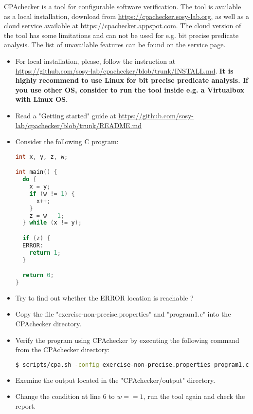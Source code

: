 \documentclass[language=en,sheet=5,prefix]{exercise}
\begin{document}
CPAchecker is a tool for configurable software verification. 
The tool is available as a local installation, download from \url{https://cpachecker.sosy-lab.org}, 
as well as a cloud service available at
\url{https://cpachecker.appspot.com}. The cloud version of the tool has some limitations 
and can not be used for e.g. bit precise predicate analysis. The list of unavailable features 
can be found on the service page.



\begin{itemize}
\item For local installation, please, follow the instruction at 
\url{https://github.com/sosy-lab/cpachecker/blob/trunk/INSTALL.md}.
\textbf{It is highly recommend to use Linux for bit precise predicate analysis. If you use other OS, consider to run the tool inside e.g. a Virtualbox with Linux OS.}

\item Read a "Getting started" guide at \url{https://github.com/sosy-lab/cpachecker/blob/trunk/README.md}
\end{itemize}


\task[Program 1]

\begin{itemize}
\item Consider the following C program:
\begin{lstlisting}[language=C]
int x, y, z, w;

int main() {
  do {
    x = y;
    if (w != 1) {
      x++;
    }      
    z = w - 1;
  } while (x != y);

  if (z) {
  ERROR:
    return 1;
  }

  return 0;
}
\end{lstlisting}
\item Try to find out whether the ERROR location is reachable ?
\item Copy the file "exercise-non-precise.properties" and "program1.c" into the CPAchecker directory.
\item Verify the program using CPAchecker by executing the following command from the CPAchecker directory:
  \begin{lstlisting}[language=bash,numbers=none]
$ scripts/cpa.sh -config exercise-non-precise.properties program1.c
  \end{lstlisting}
\item Exemine the output located in the "CPAchecker/output" directory.
\item Change the condition at line $6$ to $w == 1$, run the tool again and check the report.
\end{itemize}
\end{document}
